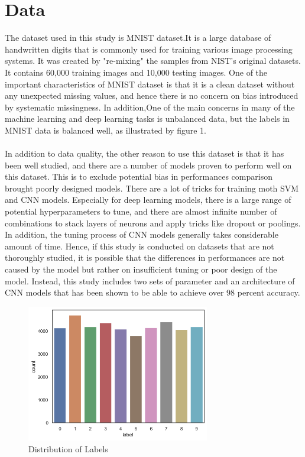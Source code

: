 \documentclass[letterpaper]{article} %
\begin{document}
\section{Data}
The dataset used in this study is MNIST dataset.It is a large database of handwritten digits that is commonly used for training various image processing systems. It was created by "re-mixing" the samples from NIST's original datasets. It contains 60,000 training images and 10,000 testing images. One of the important characteristics of MNIST dataset is that it is a clean dataset without any unexpected missing values, and hence there is no concern on bias introduced by systematic missingness. In addition,One of the main concerns in many of the machine learning and deep learning tasks is unbalanced data, but the labels in MNIST data is balanced well, as illustrated by figure 1. \\\\
In addition to data quality, the other reason to use this dataset is that it has been well studied, and there are a number of models proven to perform well on this dataset. This is to exclude potential bias in performances comparison brought poorly designed models. There are a lot of tricks for training moth SVM and CNN models. Especially for deep learning models, there is a large range of potential hyperparameters to tune, and there are almost infinite number of combinations to stack layers of neurons and apply tricks like dropout or poolings. In addition, the tuning process of CNN models generally takes considerable amount of time. Hence, if this study is conducted on datasets that are not thoroughly studied, it is possible that the differences in performances are not caused by the model but rather on insufficient tuning or poor design of the model. Instead, this study includes two sets of parameter and an architecture of CNN models that has been shown to be able to achieve over 98 percent accuracy. \\


\begin{figure}[h]
\caption{Distribution of Labels}
\centering
\includegraphics[width=8cm]{labelCount}  
\end{figure}
\end{document}
